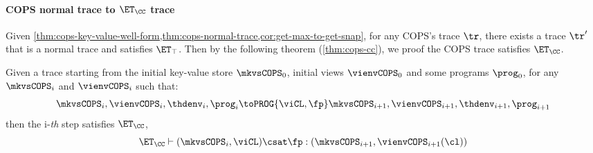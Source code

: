\paragraph{\bf COPS normal trace to \( \ET_\CC \) trace}
Given \cref{thm:cops-key-value-well-form,thm:cops-normal-trace,cor:get-max-to-get-snap}, for any COPS's trace \( \tr \), 
there exists a trace \( \tr' \) that is a normal trace and satisfies \( \ET_\top \).
Then by the following theorem (\cref{thm:cops-cc}), we proof the COPS trace satisfies \( \ET_\CC \).

\begin{theorem}
    \label{thm:cops-cc}
    Given a trace starting from the initial key-value store \( \mkvsCOPS_0 \), initial views \( \vienvCOPS_0 \) and some programs \( \prog_0 \), for any \( \mkvsCOPS_i \) and \( \vienvCOPS_i \)  such that: 
    \[
        \mkvsCOPS_i, \vienvCOPS_i, \thdenv_i, \prog_i \toPROG{\viCL,\fp} \mkvsCOPS_{i+1}, \vienvCOPS_{i+1}, \thdenv_{i+1}, \prog_{i+1} 
    \]
    then the i-\emph{th} step satisfies \( \ET_\CC \), \ie
    \[
        \ET_\CC \vdash ( \mkvsCOPS_i, \viCL ) \csat \fp : (\mkvsCOPS_{i+1},\vienvCOPS_{i+1}(\cl) )
    \]
\end{theorem}
